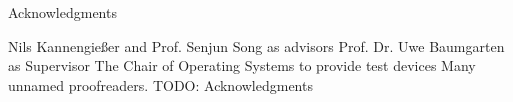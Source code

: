 \thispagestyle{empty}

\vspace*{2cm}

\begin{center}
{ Acknowledgments}
\end{center}

\vspace{1cm}

Nils Kannengießer and Prof. Senjun Song as advisors
Prof. Dr. Uwe Baumgarten as Supervisor
The Chair of Operating Systems to provide test devices
Many unnamed proofreaders.
TODO: Acknowledgments

\cleardoublepage{}
